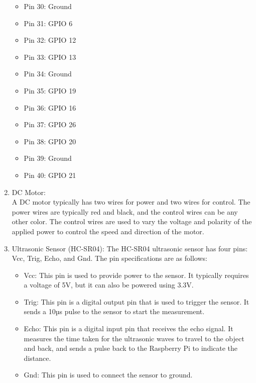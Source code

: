 \documentclass[11pt]{article}
\begin{document}
\begin{enumerate}
\begin{itemize}
		      \item Pin 30: Ground
		      \item Pin 31: GPIO 6
		      \item Pin 32: GPIO 12
		      \item Pin 33: GPIO 13
		      \item Pin 34: Ground
		      \item Pin 35: GPIO 19
		      \item Pin 36: GPIO 16
		      \item Pin 37: GPIO 26
		      \item Pin 38: GPIO 20
		      \item Pin 39: Ground
		      \item Pin 40: GPIO 21
	      \end{itemize}
	\item DC Motor: \\
	      A DC motor typically has two wires for power and two wires for control. The power wires are typically red and black, and the control wires can be any other color. The control wires are used to vary the voltage and polarity of the applied power to control the speed and direction of the motor.
	\item Ultrasonic Sensor (HC-SR04): The HC-SR04 ultrasonic sensor has four pins: Vcc, Trig, Echo, and Gnd. The pin specifications are as follows:
	      \begin{itemize}
		      \item Vcc: This pin is used to provide power to the sensor. It typically requires a voltage of 5V, but it can also be powered using 3.3V.
		      \item Trig: This pin is a digital output pin that is used to trigger the sensor. It sends a 10µs pulse to the sensor to start the measurement.
		      \item Echo: This pin is a digital input pin that receives the echo signal. It measures the time taken for the ultrasonic waves to travel to the object and back, and sends a pulse back to the Raspberry Pi to indicate the distance.
		      \item Gnd: This pin is used to connect the sensor to ground.
	      \end{itemize}
\end{enumerate}
\end{document}
